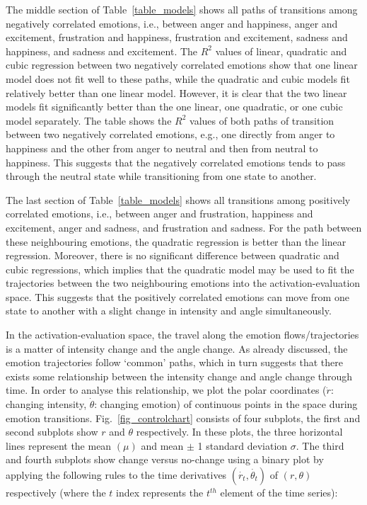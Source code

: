 \documentclass[10pt,journal,cspaper,compsoc]{IEEEtran}
\begin{document}
The middle section of Table~\ref{table_models} shows all paths of transitions among negatively correlated emotions, i.e., between anger and happiness, anger and excitement, frustration and happiness, frustration and excitement, sadness and happiness, and sadness and excitement. The $R^{2}$ values of linear, quadratic and cubic regression between two negatively correlated emotions show that one linear model does not fit well to these paths, while the quadratic and cubic models fit relatively better than one linear model. However, it is clear that the two linear models fit significantly better than the one linear, one quadratic, or one cubic model separately. The table shows the $R^{2}$ values of both paths of transition between two negatively correlated emotions, e.g., one directly from anger to happiness and the other from anger to neutral and then from neutral to happiness. This suggests that the negatively correlated emotions tends to pass through the neutral state while transitioning from one state to another.

The last section of Table~\ref{table_models} shows all transitions among positively correlated emotions, i.e., between anger and frustration, happiness and excitement, anger and sadness, and frustration and sadness. For the path between these neighbouring emotions, the quadratic regression is better than the linear regression. Moreover, there is no significant difference between quadratic and cubic regressions, which implies that the quadratic model may be used to fit the trajectories between the two neighbouring emotions into the activation-evaluation space. This suggests that the positively correlated emotions can move from one state to another with a slight change in intensity and angle simultaneously.

In the activation-evaluation space, the travel along the emotion flows/trajectories is a matter of intensity change and the angle change. As already discussed, the emotion trajectories follow `common' paths, which in turn suggests that there exists some relationship between the intensity change and angle change through time. In order to analyse this relationship, we plot the polar coordinates ($\dot{r}$: changing intensity, $\dot{\theta}$: changing emotion) of continuous points in the space during emotion transitions. Fig.~\ref{fig_controlchart} consists of four subplots, the first and second subplots show $r$ and $\theta$ respectively. In these plots, the three horizontal lines represent the mean $(\mu)$ and mean $\pm$ 1 standard deviation $\sigma$. The third and fourth subplots show change versus no-change using a binary plot by applying the following rules to the time derivatives $(\dot{r_{t}},\dot{\theta_{t}})$ of $(r,\theta)$ respectively (where the $t$ index represents the $t^{th}$ element of the time series):
\end{document}
